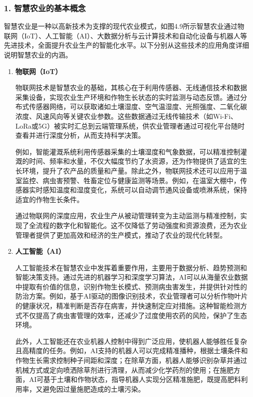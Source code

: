 \subsubsection{1. 智慧农业的基本概念}

智慧农业是一种以高新技术为支撑的现代农业模式，如图4.9所示智慧农业通过物联网（IoT）、人工智能（AI）、大数据分析与云计算技术和自动化设备与机器人等先进技术，全面提升农业生产的智能化水平。以下分别从这些技术的应用角度详细说明智慧农业的内涵。
\begin{enumerate}[(1)] 
  \item \textbf{物联网（IoT）}
  
    物联网技术是智慧农业的基础，其核心在于利用传感器、无线通信技术和数据采集设备，实现农业生产环境和作物生长状态的实时监测与动态反馈。通过分布式传感器网络，可以获取诸如土壤湿度、空气温湿度、光照强度、二氧化碳浓度、风速风向等关键农业参数。这些数据通过无线传输技术（如Wi-Fi、LoRa或5G）被实时汇总到云端管理系统，供农业管理者通过可视化平台随时查看并进行深度分析，从而支持科学决策。
    
    例如，智能灌溉系统利用传感器采集的土壤湿度和气象数据，可以精准控制灌溉的时间、频率和水量，不仅大幅度节约了水资源，还为作物提供了适宜的生长环境，提升了农产品的质量和产量。除此之外，物联网技术还可以应用于温室监控、病虫害预警、牲畜定位与健康监测等场景。例如，在温室大棚中，传感器实时感知温度和湿度变化，系统可以自动调节通风设备或喷淋系统，保持适宜的作物生长条件。
    
    通过物联网的深度应用，农业生产从被动管理转变为主动监测与精准控制，实现了全流程的数字化和智能化。这不仅降低了劳动强度和资源浪费，还为农业管理者提供了更加高效和经济的生产模式，推动了农业的现代化转型。

  \item \textbf{人工智能（AI）}
  
    人工智能技术在智慧农业中发挥着重要作用，主要用于数据分析、趋势预测和智能决策支持。通过先进的机器学习和深度学习算法，AI可以从海量农业数据中提取有价值的信息，识别作物生长模式、预测病虫害发生，并提供针对性的防治方案。例如，基于AI驱动的图像识别技术，农业管理者可以分析作物叶片的健康状况，精准判断是否存在病害，并快速制定应对措施。这种智能检测方式不仅提高了病虫害管理的效率，还减少了过度使用农药的风险，保护了生态环境。
    
    此外，人工智能还在农业机器人控制中得到广泛应用，使机器人能够胜任复杂且高精度的任务。例如，AI支持的机器人可以完成精准播种，根据土壤条件和作物生长需求控制种子间距和深度；在除草方面，机器人能够识别杂草并通过机械方式或定向喷洒除草剂进行清理，从而减少化学药剂的使用；在施肥方面，AI可基于土壤和作物状态，指导机器人实现分区精准施肥，既提高肥料利用率，又避免因过量施肥造成的土壤污染。
    

\end{enumerate}
